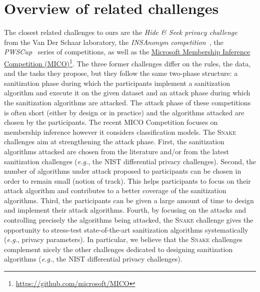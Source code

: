 \documentclass{article}
\newcommand{\myhref}[2]{\href{#1}{#2}\footnote{\url{#1}}}
\newcommand{\name}{\textsc{Snake}\xspace}
\begin{document}
\section{Overview of related challenges}
\label{sec:related}
The closest related challenges to ours are the \emph{Hide \& Seek privacy challenge}~\cite{haspc2021} from the Van Der Schaar laboratory, the \emph{INSAnonym competition}~\cite{boutet:hal-02512677}, the \emph{PWSCup}~\cite{pwscup2021} series of competitions, as well as the \myhref{https://github.com/microsoft/MICO}{Microsoft Membership Inference Competition (MICO)}.
The three former challenges differ on the rules, the data, and the tasks they propose, but they follow the same two-phase structure: a sanitization phase during which the participants implement a sanitization algorithm and execute it on the given dataset and an attack phase during which the sanitization algorithms are attacked.
The attack phase of these competitions is often short (either by design or in practice) and the
algorithms attacked are chosen by the participants.
The recent MICO Competition focuses on membership inference however it considers classification models.
The \name challenges aim at strengthening the attack phase.
First, the sanitization algorithms attacked are chosen from the literature and/or from the latest sanitization challenges (\emph{e.g.}, the NIST differential privacy challenges).
Second, the number of algorithms under attack proposed to participants can be chosen in order to remain small (notion of track). This helps participants to focus on their attack algorithm and contributes to a better coverage of the sanitization algorithms.
Third, the participants can be given a large amount of time to design and implement their attack algorithms.
Fourth, by focusing on the attacks and controlling precisely the algorithms being attacked, the \name challenge gives the opportunity to stress-test state-of-the-art sanitization algorithms systematically (\emph{e.g.}, privacy parameters).
In particular, we believe that the \name challenges complement nicely the other challenges dedicated to designing sanitization algorithms (\emph{e.g.}, the NIST differential privacy challenges).
\end{document}
